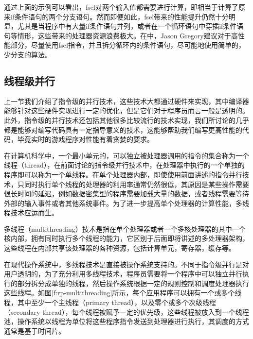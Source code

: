 通过上面的示例可以看出，fsel对两个输入值都需要进行计算，即相当于计算了原来if条件语句的两个分支语句。然而即便如此，fsel带来的性能提升仍然十分明显，尤其是当程序中有大量if条件语句并列，或者在一个循环语句中穿插if条件语句等情形，这些带来的处理器资源浪费极大。在\cite{a:DoggedDetermination:TechnologyandProcessatNaughtyDogInc.}中，Jason Gregory建议对于高性能部分，尽量使用fsel指令，并且拆分循环内的条件语句，尽可能地使用简单的，少分支的算法。




\subsection{线程级并行}
上一节我们介绍了指令级的并行技术，这些技术大都通过硬件来实现，其中编译器能够针对这些硬件实现进行一定的优化，但是它们对于程序员而言一般是透明的。此外，指令级的并行技术还包括其他很多比较流行的技术实现，我们所讨论的几乎都是能够对编写代码具有一定指导意义的技术，这能够帮助我们编写更高性能的代码，毕竟实时的游戏程序对性能有着贪婪的要求。

在计算机科学中，一个最小单元的，可以独立被处理器调用的指令的集合称为一个线程（thread），在前面讨论的指令级并行技术中，在处理器中执行的一个单独的程序即可以称为一个单线程。在单个处理器内部，即使使用前面讲述的指令并行技术，只同时执行单个线程的处理器的利用率通常仍然很低，其原因是某些操作需要很长时间的延迟，例如数据密集型的程序需要加载大量的数据，或者线程需要等待外部的输入事件或者其他系统事件。为了进一步提高单个处理器的计算性能，多线程技术应运而生。

多线程（multithreading）技术是指在单个处理器或者一个多核处理器的其中一个核内部，拥有同时执行多个线程的能力，它区别于后面即将讲述的多处理器架构，这些线程在内部共享该处理器的各种资源，包括计算单元，寄存器，缓存等。

在现代操作系统中，多线程技术是直接被操作系统支持的。不同于指令级并行是对用户透明的，为了充分利用多线程技术，程序员需要将一个程序中可以独立并行执行的部分拆分成单独的线程，然后操作系统根据一定的规则控制和调度处理器执行这些线程。如图\ref{f:rp-multithreading}所示，每个应用程序可以拥有一个或多个线程，其中至少一个主线程（primary thread），以及零个或多个次级线程（secondary thread），每个线程被赋予一定的优先级，这些线程被放入到一个线程池，操作系统以线程为单位将这些程序指令发送到处理器进行执行，其调度的方式通常是基于时间片。

